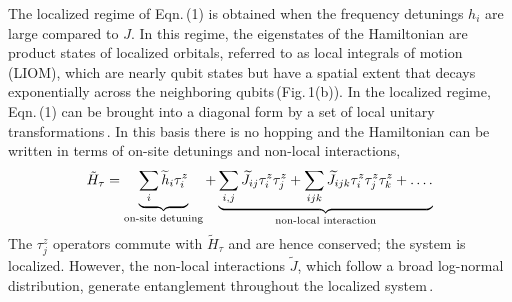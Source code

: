 The localized regime of Eqn.\,(1) is obtained when the frequency detunings $h_i$ are large compared to $J$. In this regime, the eigenstates of the Hamiltonian are product states of localized orbitals, referred to as local integrals of motion (LIOM), which are nearly qubit states but have a spatial extent that decays exponentially across the neighboring qubits\,(Fig.\,1(b)). In the localized regime, Eqn.\,(1) can be brought into a diagonal form by a set of local unitary transformations\,\cite{Serbyn2013, Huse2014}. In this basis there is no hopping and the Hamiltonian can be written in terms of on-site detunings and non-local interactions,
\vspace{10pt}
\begin{equation} %
\tilde{H}_{\tau} = \underbrace{\sum_i \widetilde{h}_i \tau^z_i}_{\text{on-site detuning}} + \underbrace{ \sum_{i,j} \widetilde{J}_{ij}\tau^z_i\tau^z_j + \sum_{ijk} \widetilde{J}_{ijk}\tau^z_i\tau^z_j\tau^z_k + \mathellipsis.}_{\text{non-local interaction}}%
\end{equation}
\noindent
The $\tau^z_j$ operators commute with $\tilde H_{\tau}$ and are hence conserved; the system is localized. However, the non-local interactions $\widetilde{J}$, which follow a broad log-normal distribution, generate entanglement throughout the localized system\,\cite{Varma2019}.

